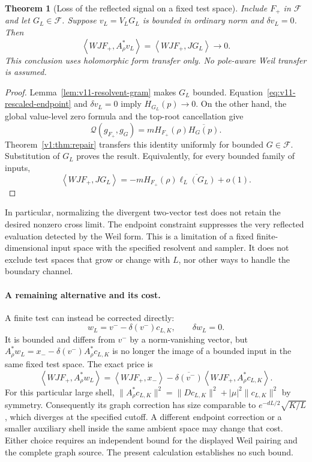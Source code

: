 \documentclass[11pt]{article}
\newtheorem{theorem}{Theorem}[section]
\theoremstyle{remark}
\newcommand{\ip}[2]{\left\langle #1,#2\right\rangle}
\newcommand{\Q}{\mathcal Q}
\begin{document}
\begin{theorem}[Loss of the reflected signal on a fixed test space]
\label{thm:v11-fixed-tests}
Include $F_+$ in $\mathcal F$ and let $G_L\in\mathcal F$.
Suppose $v_L=V_LG_L$ is bounded in ordinary norm and $\delta v_L=0$.
Then
\begin{equation}\label{eq:v11-signal-loss}
 \ip{WJF_+}{A_\rho^*v_L}
       =\ip{WJF_+}{JG_L}\longrightarrow0.
\end{equation}
This conclusion uses holomorphic form transfer only. No pole-aware
Weil transfer is assumed.
\end{theorem}
\begin{proof}
Lemma~\ref{lem:v11-resolvent-gram} makes $G_L$ bounded.
Equation~\eqref{eq:v11-rescaled-endpoint} and $\delta v_L=0$
imply $H_{G_L}(p)\to0$. On the other hand, the global value-level
zero formula and the top-root cancellation give
\[
 \Q(g_{F_+},g_G)=mH_{F_+}(\rho)\overline{H_G(p)}.
\]
Theorem~\ref{v1:thm:repair} transfers this identity uniformly for
bounded $G\in\mathcal F$. Substitution of $G_L$ proves the result.
Equivalently, for every bounded family of inputs,
\begin{equation}\label{eq:v11-endpoint-cross-relation}
 \ip{WJF_+}{JG_L}
   =-mH_{F_+}(\rho)\overline{\ell_L(G_L)}+o(1).
\end{equation}
\end{proof}

In particular, normalizing the divergent two-vector test does not retain
the desired nonzero cross limit. The endpoint constraint suppresses the
very reflected evaluation detected by the Weil form. This is a limitation
of a fixed finite-dimensional input space with the specified resolvent
and sampler. It does not exclude test spaces that grow or change with
$L$, nor other ways to handle the boundary channel.

\paragraph{A remaining alternative and its cost.}
A finite test can instead be corrected directly:
\[
 w_L=v^- -\delta(v^-)c_{L,K},\qquad \delta w_L=0.
\]
It is bounded and differs from $v^-$ by a norm-vanishing vector, but
$A_\rho^*w_L=x_- -\delta(v^-)A_\rho^*c_{L,K}$ is no longer the
image of a bounded input in the same fixed test space. The exact price is
\[
 \ip{WJF_+}{A_\rho^*w_L}
 =\ip{WJF_+}{x_-}
  -\overline{\delta(v^-)}\ip{WJF_+}{A_\rho^*c_{L,K}}.
\]
For this particular large shell,
$\|A_\rho^*c_{L,K}\|^2=\|Dc_{L,K}\|^2+
|\mu|^2\|c_{L,K}\|^2$ by symmetry. Consequently its graph
correction has size comparable to
$e^{-dL/2}\sqrt{K/L}$, which diverges at the specified cutoff.
A different endpoint correction or a smaller auxiliary shell inside the
same ambient space may change that cost. Either choice requires an
independent bound for the displayed Weil pairing and the complete graph
source. The present calculation establishes no such bound.
\end{document}
